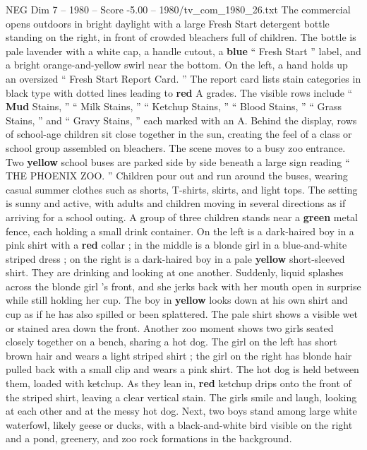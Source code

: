 \begin{textsample}{NEG Dim 7 – 1980 – Score -5.00 – 1980/tv\_com\_1980\_26.txt}  \label{ex:f7_neg_054}
The commercial opens outdoors in bright daylight with a large Fresh Start detergent bottle standing on the right, in front of crowded bleachers full of children.
The bottle is pale lavender with a white cap, a handle cutout, a \textbf{blue} “ Fresh Start ” label, and a bright orange-and-yellow swirl near the bottom.
On the left, a hand holds up an oversized “ Fresh Start Report Card. ” The report card lists stain categories in black type with dotted lines leading to \textbf{red} A grades.
The visible rows include “ \textbf{Mud} Stains, ” “ Milk Stains, ” “ Ketchup Stains, ” “ Blood Stains, ” “ Grass Stains, ” and “ Gravy Stains, ” each marked with an A.
Behind the display, rows of school-age children sit close together in the sun, creating the feel of a class or school group assembled on bleachers.
The scene moves to a busy zoo entrance.
Two \textbf{yellow} school buses are parked side by side beneath a large sign reading “ THE PHOENIX ZOO. ” Children pour out and run around the buses, wearing casual summer clothes such as shorts, T-shirts, skirts, and light tops.
The setting is sunny and active, with adults and children moving in several directions as if arriving for a school outing.
A group of three children stands near a \textbf{green} metal fence, each holding a small drink container.
On the left is a dark-haired boy in a pink shirt with a \textbf{red} collar ; in the middle is a blonde girl in a blue-and-white striped dress ; on the right is a dark-haired boy in a pale \textbf{yellow} short-sleeved shirt.
They are drinking and looking at one another.
Suddenly, liquid splashes across the blonde girl ’s front, and she jerks back with her mouth open in surprise while still holding her cup.
The boy in \textbf{yellow} looks down at his own shirt and cup as if he has also spilled or been splattered.
The pale shirt shows a visible wet or stained area down the front.
Another zoo moment shows two girls seated closely together on a bench, sharing a hot dog.
The girl on the left has short brown hair and wears a light striped shirt ; the girl on the right has blonde hair pulled back with a small clip and wears a pink shirt.
The hot dog is held between them, loaded with ketchup.
As they lean in, \textbf{red} ketchup drips onto the front of the striped shirt, leaving a clear vertical stain.
The girls smile and laugh, looking at each other and at the messy hot dog.
Next, two boys stand among large white waterfowl, likely geese or ducks, with a black-and-white bird visible on the right and a pond, greenery, and zoo rock formations in the background.

\end{textsample}
